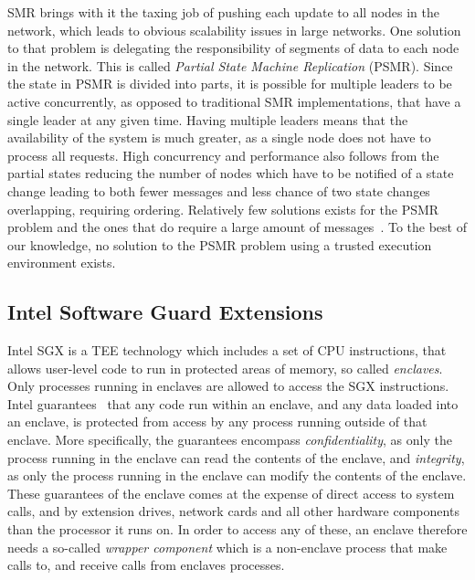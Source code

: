 \documentclass{article}
\begin{document}
		SMR brings with it the taxing job of pushing each update to all nodes in the network, which leads to obvious scalability issues in large networks.
		One solution to that problem is delegating the responsibility of segments of data to each node in the network.
		This is called \textit{Partial State Machine Replication} (PSMR).
		Since the state in PSMR is divided into parts, it is possible for multiple leaders to be active concurrently, as opposed to traditional SMR implementations, that have a single leader at any given time.
		Having multiple leaders means that the availability of the system is much greater, as a single node does not have to process all requests.
		High concurrency and performance also follows from the partial states reducing the number of nodes which have to be notified of a state change leading to both fewer messages and less chance of two state changes overlapping, requiring ordering.
		Relatively few solutions exists for the PSMR problem and the ones that do require a large amount of messages~\cite{sousa_partial_2001}.
		To the best of our knowledge, no solution to the PSMR problem using a trusted execution environment exists.

		\subsection{Intel Software Guard Extensions}
		\label{subsec:intel-sgx}

		Intel SGX is a TEE technology which includes a set of CPU instructions, that allows user-level code to run in protected areas of memory, so called \textit{enclaves}.
		Only processes running in enclaves are allowed to access the SGX instructions.
		Intel guarantees~\cite{intel_sgx} that any code run within an enclave, and any data loaded into an enclave, is protected from access by any process running outside of that enclave.
		More specifically, the guarantees encompass \textit{confidentiality}, as only the process running in the enclave can read the contents of the enclave, and \textit{integrity}, as only the process running in the enclave can modify the contents of the enclave.
		These guarantees of the enclave comes at the expense of direct access to system calls, and by extension drives, network cards and all other hardware components than the processor it runs on.
		In order to access any of these, an enclave therefore needs a so-called \textit{wrapper component} which is a non-enclave process that make calls to, and receive calls from enclaves processes.
\end{document}
